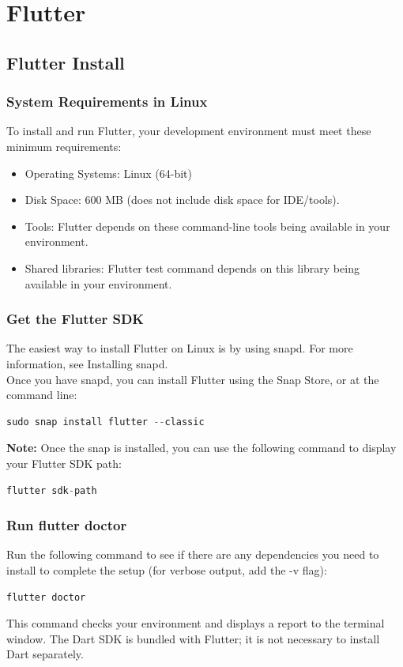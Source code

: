 \chapter{Flutter}
\section{Flutter Install}
\subsection{System Requirements in Linux}
To install and run Flutter, your development environment must meet these minimum requirements:\\
\begin{itemize}
	\item Operating Systems: Linux (64-bit)
	\item Disk Space: 600 MB (does not include disk space for IDE/tools).
	\item Tools: Flutter depends on these command-line tools being available in your environment.
	\item Shared libraries: Flutter test command depends on this library being available in your environment.
\end{itemize}

\subsection{Get the Flutter SDK}
The easiest way to install Flutter on Linux is by using snapd. For more information, see Installing snapd.\\
Once you have snapd, you can install Flutter using the Snap Store, or at the command line:
\begin{lstlisting}[language=C]
	 sudo snap install flutter --classic
\end{lstlisting}
\textbf{Note: }Once the snap is installed, you can use the following command to display your Flutter SDK path:
\begin{lstlisting}[language=C]
	 flutter sdk-path
\end{lstlisting}

\subsection{Run flutter doctor}
Run the following command to see if there are any dependencies you need to install to complete the setup (for verbose output, add the -v flag):
\begin{lstlisting}[language=C]
	 flutter doctor
\end{lstlisting}
This command checks your environment and displays a report to the terminal window. The Dart SDK is bundled with Flutter; it is not necessary to install Dart separately. 
